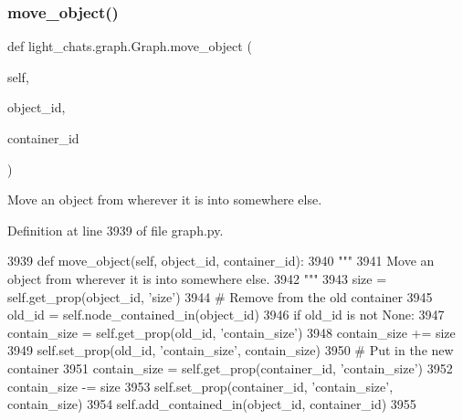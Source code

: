 \subsubsection{\texorpdfstring{move\+\_\+object()}{move\_object()}}
{\footnotesize\ttfamily def light\+\_\+chats.\+graph.\+Graph.\+move\+\_\+object (\begin{DoxyParamCaption}\item[{}]{self,  }\item[{}]{object\+\_\+id,  }\item[{}]{container\+\_\+id }\end{DoxyParamCaption})}

\begin{DoxyVerb}Move an object from wherever it is into somewhere else.
\end{DoxyVerb}
 

Definition at line 3939 of file graph.\+py.


\begin{DoxyCode}
3939     \textcolor{keyword}{def }move\_object(self, object\_id, container\_id):
3940         \textcolor{stringliteral}{"""}
3941 \textcolor{stringliteral}{        Move an object from wherever it is into somewhere else.}
3942 \textcolor{stringliteral}{        """}
3943         size = self.get\_prop(object\_id, \textcolor{stringliteral}{'size'})
3944         \textcolor{comment}{# Remove from the old container}
3945         old\_id = self.node\_contained\_in(object\_id)
3946         \textcolor{keywordflow}{if} old\_id \textcolor{keywordflow}{is} \textcolor{keywordflow}{not} \textcolor{keywordtype}{None}:
3947             contain\_size = self.get\_prop(old\_id, \textcolor{stringliteral}{'contain\_size'})
3948             contain\_size += size
3949             self.set\_prop(old\_id, \textcolor{stringliteral}{'contain\_size'}, contain\_size)
3950         \textcolor{comment}{# Put in the new container}
3951         contain\_size = self.get\_prop(container\_id, \textcolor{stringliteral}{'contain\_size'})
3952         contain\_size -= size
3953         self.set\_prop(container\_id, \textcolor{stringliteral}{'contain\_size'}, contain\_size)
3954         self.add\_contained\_in(object\_id, container\_id)
3955 
\end{DoxyCode}
\mbox{\label{classlight__chats_1_1graph_1_1Graph_a2da14e9a8a4c547fea59eee63dd9f70c}} 
